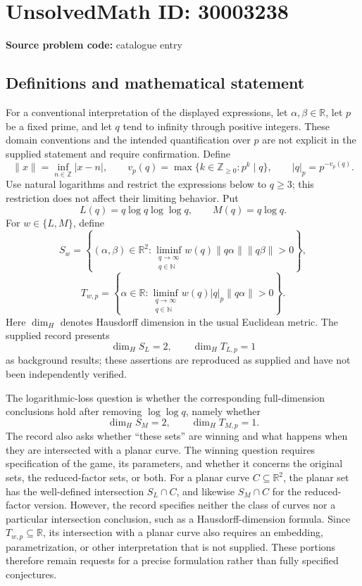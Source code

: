 \documentclass[11pt]{article}
\newcommand{\N}{\mathbb{N}}
\newcommand{\Z}{\mathbb{Z}}
\newcommand{\R}{\mathbb{R}}
\begin{document}
\section*{UnsolvedMath ID: 30003238}
\textbf{Source problem code:} catalogue entry
\subsection{Definitions and mathematical statement}
For a conventional interpretation of the displayed expressions, let \(\alpha,\beta\in\R\), let \(p\) be a fixed prime, and let \(q\) tend to infinity through positive integers. These domain conventions and the intended quantification over \(p\) are not explicit in the supplied statement and require confirmation. Define
\[
\|x\|=\inf_{n\in\Z}|x-n|,\qquad
v_p(q)=\max\{k\in\Z_{\ge0}:p^k\mid q\},\qquad
|q|_p=p^{-v_p(q)}.
\]
Use natural logarithms and restrict the expressions below to \(q\ge3\); this restriction does not affect their limiting behavior. Put
\[
L(q)=q\log q\log\log q,\qquad M(q)=q\log q.
\]
For \(w\in\{L,M\}\), define
\[
S_w=\left\{(\alpha,\beta)\in\R^2:
\liminf_{\substack{q\to\infty\\q\in\N}}w(q)\|q\alpha\|\|q\beta\|>0\right\},
\]
\[
T_{w,p}=\left\{\alpha\in\R:
\liminf_{\substack{q\to\infty\\q\in\N}}w(q)|q|_p\|q\alpha\|>0\right\}.
\]
Here \(\dim_H\) denotes Hausdorff dimension in the usual Euclidean metric. The supplied record presents
\[
\dim_H S_L=2,\qquad \dim_H T_{L,p}=1
\]
as background results; these assertions are reproduced as supplied and have not been independently verified.

The logarithmic-loss question is whether the corresponding full-dimension conclusions hold after removing \(\log\log q\), namely whether
\[
\dim_H S_M=2,\qquad \dim_H T_{M,p}=1.
\]
The record also asks whether ``these sets'' are winning and what happens when they are intersected with a planar curve. The winning question requires specification of the game, its parameters, and whether it concerns the original sets, the reduced-factor sets, or both. For a planar curve \(C\subseteq\R^2\), the planar set has the well-defined intersection \(S_L\cap C\), and likewise \(S_M\cap C\) for the reduced-factor version. However, the record specifies neither the class of curves nor a particular intersection conclusion, such as a Hausdorff-dimension formula. Since \(T_{w,p}\subseteq\R\), its intersection with a planar curve also requires an embedding, parametrization, or other interpretation that is not supplied. These portions therefore remain requests for a precise formulation rather than fully specified conjectures.
\end{document}
